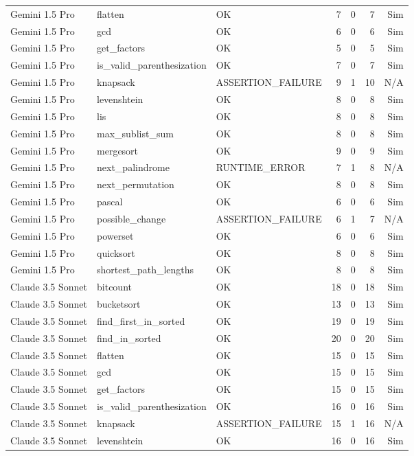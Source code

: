 \begin{longtable}{lllrrrr}
Gemini 1.5 Pro & flatten & OK & 7 & 0 & 7 & Sim \\
Gemini 1.5 Pro & gcd & OK & 6 & 0 & 6 & Sim \\
Gemini 1.5 Pro & get\_factors & OK & 5 & 0 & 5 & Sim \\
Gemini 1.5 Pro & is\_valid\_parenthesization & OK & 7 & 0 & 7 & Sim \\
Gemini 1.5 Pro & knapsack & ASSERTION\_FAILURE & 9 & 1 & 10 & N/A \\
Gemini 1.5 Pro & levenshtein & OK & 8 & 0 & 8 & Sim \\
Gemini 1.5 Pro & lis & OK & 8 & 0 & 8 & Sim \\
Gemini 1.5 Pro & max\_sublist\_sum & OK & 8 & 0 & 8 & Sim \\
Gemini 1.5 Pro & mergesort & OK & 9 & 0 & 9 & Sim \\
Gemini 1.5 Pro & next\_palindrome & RUNTIME\_ERROR & 7 & 1 & 8 & N/A \\
Gemini 1.5 Pro & next\_permutation & OK & 8 & 0 & 8 & Sim \\
Gemini 1.5 Pro & pascal & OK & 6 & 0 & 6 & Sim \\
Gemini 1.5 Pro & possible\_change & ASSERTION\_FAILURE & 6 & 1 & 7 & N/A \\
Gemini 1.5 Pro & powerset & OK & 6 & 0 & 6 & Sim \\
Gemini 1.5 Pro & quicksort & OK & 8 & 0 & 8 & Sim \\
Gemini 1.5 Pro & shortest\_path\_lengths & OK & 8 & 0 & 8 & Sim \\
Claude 3.5 Sonnet & bitcount & OK & 18 & 0 & 18 & Sim \\
Claude 3.5 Sonnet & bucketsort & OK & 13 & 0 & 13 & Sim \\
Claude 3.5 Sonnet & find\_first\_in\_sorted & OK & 19 & 0 & 19 & Sim \\
Claude 3.5 Sonnet & find\_in\_sorted & OK & 20 & 0 & 20 & Sim \\
Claude 3.5 Sonnet & flatten & OK & 15 & 0 & 15 & Sim \\
Claude 3.5 Sonnet & gcd & OK & 15 & 0 & 15 & Sim \\
Claude 3.5 Sonnet & get\_factors & OK & 15 & 0 & 15 & Sim \\
Claude 3.5 Sonnet & is\_valid\_parenthesization & OK & 16 & 0 & 16 & Sim \\
Claude 3.5 Sonnet & knapsack & ASSERTION\_FAILURE & 15 & 1 & 16 & N/A \\
Claude 3.5 Sonnet & levenshtein & OK & 16 & 0 & 16 & Sim \\

\end{longtable}
